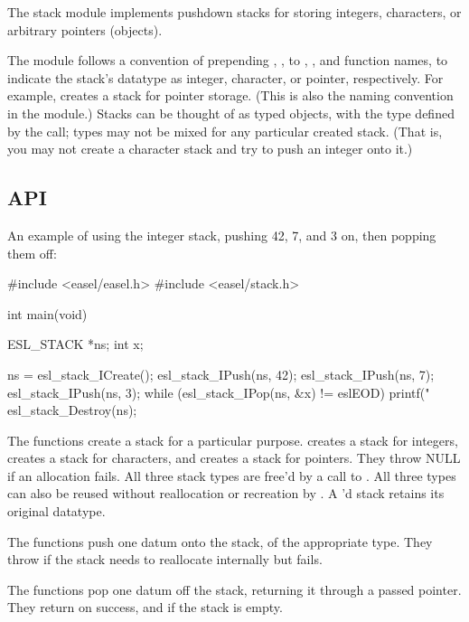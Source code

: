 The stack module implements pushdown stacks for storing integers,
characters, or arbitrary pointers (objects).

The module follows a convention of prepending , ,
 to , , and 
function names, to indicate the stack's datatype as integer,
character, or pointer, respectively. For example,
 creates a stack for pointer
storage. (This is also the naming convention in the 
module.)  Stacks can be thought of as typed objects, with the type
defined by the  call; types may not be mixed for any
particular created stack. (That is, you may not create a character
stack and try to push an integer onto it.)

\subsection{API}
   
An example of using the integer stack, pushing 42, 7, and 3 on, then
popping them off:

\begin{cchunk}
#include <easel/easel.h>
#include <easel/stack.h>

int main(void)
{
   ESL_STACK *ns;
   int        x;

   ns = esl_stack_ICreate();
   esl_stack_IPush(ns, 42);
   esl_stack_IPush(ns, 7);
   esl_stack_IPush(ns, 3);
   while (esl_stack_IPop(ns, &x) != eslEOD) 
      printf("%
   esl_stack_Destroy(ns);   
}
\end{cchunk}

The  functions create a stack for a particular
purpose.  creates a stack for integers,
 creates a stack for characters, and
 creates a stack for pointers.  They
throw NULL if an allocation fails.  All three stack types are free'd
by a call to . All three types can also
be reused without reallocation or recreation by
. A 'd stack retains its
original datatype.

The  functions push one datum onto the stack, of the
appropriate type. They throw  if the stack needs to
reallocate internally but fails.

The  functions pop one datum off the stack, returning it
through a passed pointer. They return  on success, and
 if the stack is empty.

